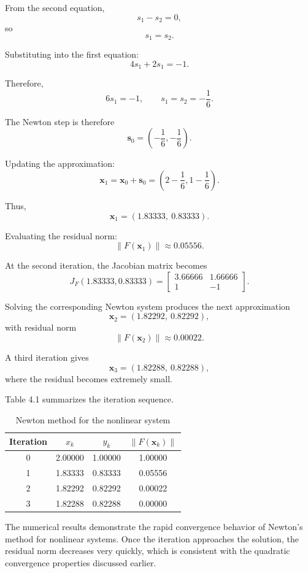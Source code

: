 From the second equation,
\[
s_1-s_2=0,
\]
so
\[
s_1=s_2.
\]

Substituting into the first equation:
\[
4s_1+2s_1=-1.
\]

Therefore,
\[
6s_1=-1,
\qquad
s_1=s_2=-\frac16.
\]

The Newton step is therefore
\[
\mathbf{s}_0=
\left(
-\frac16,
-\frac16
\right).
\]

Updating the approximation:
\[
\mathbf{x}_1
=
\mathbf{x}_0+\mathbf{s}_0
=
\left(
2-\frac16,
1-\frac16
\right).
\]

Thus,
\[
\mathbf{x}_1
=
(1.83333,\ 0.83333).
\]

Evaluating the residual norm:
\[
\|F(\mathbf{x}_1)\|
\approx
0.05556.
\]

At the second iteration, the Jacobian matrix becomes
\[
J_F(1.83333,0.83333)
=
\begin{bmatrix}
3.66666 & 1.66666 \\
1 & -1
\end{bmatrix}.
\]

Solving the corresponding Newton system produces the next approximation
\[
\mathbf{x}_2
=
(1.82292,\ 0.82292),
\]
with residual norm
\[
\|F(\mathbf{x}_2)\|
\approx
0.00022.
\]

A third iteration gives
\[
\mathbf{x}_3
=
(1.82288,\ 0.82288),
\]
where the residual becomes extremely small.

Table 4.1 summarizes the iteration sequence.

\begin{table}[h!]
\centering
\caption{Newton method for the nonlinear system}
\label{tab:newton_system_example}
\begin{tabular}{|c|c|c|c|}
\hline
Iteration & \(x_k\) & \(y_k\) & \(\|F(\mathbf{x}_k)\|\) \\ \hline
0 & 2.00000 & 1.00000 & 1.00000 \\ \hline
1 & 1.83333 & 0.83333 & 0.05556 \\ \hline
2 & 1.82292 & 0.82292 & 0.00022 \\ \hline
3 & 1.82288 & 0.82288 & 0.00000 \\ \hline
\end{tabular}
\end{table}

The numerical results demonstrate the rapid convergence behavior of Newton's method for nonlinear systems. Once the iteration approaches the solution, the residual norm decreases very quickly, which is consistent with the quadratic convergence properties discussed earlier.

